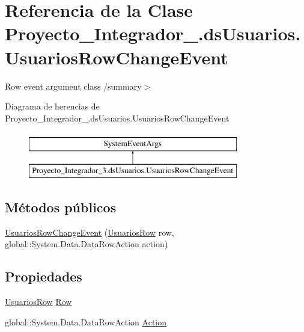 \hypertarget{class_proyecto___integrador__3_1_1ds_usuarios_1_1_usuarios_row_change_event}{\section{Referencia de la Clase Proyecto\-\_\-\-Integrador\-\_.\-ds\-Usuarios.\-Usuarios\-Row\-Change\-Event}
\label{class_proyecto___integrador__3_1_1ds_usuarios_1_1_usuarios_row_change_event}
}


Row event argument class /summary$>$  


Diagrama de herencias de Proyecto\-\_\-\-Integrador\-\_.\-ds\-Usuarios.\-Usuarios\-Row\-Change\-Event\begin{figure}[H]
\begin{center}
\leavevmode
\includegraphics[height=2.000000cm]{class_proyecto___integrador__3_1_1ds_usuarios_1_1_usuarios_row_change_event}
\end{center}
\end{figure}
\subsection*{Métodos públicos}
\begin{DoxyCompactItemize}
\item 
\hyperlink{class_proyecto___integrador__3_1_1ds_usuarios_1_1_usuarios_row_change_event_a2bb91a739acbdbba94b0c5d878fa93e4}{Usuarios\-Row\-Change\-Event} (\hyperlink{class_proyecto___integrador__3_1_1ds_usuarios_1_1_usuarios_row}{Usuarios\-Row} row, global\-::\-System.\-Data.\-Data\-Row\-Action action)
\end{DoxyCompactItemize}
\subsection*{Propiedades}
\begin{DoxyCompactItemize}
\item 
\hyperlink{class_proyecto___integrador__3_1_1ds_usuarios_1_1_usuarios_row}{Usuarios\-Row} \hyperlink{class_proyecto___integrador__3_1_1ds_usuarios_1_1_usuarios_row_change_event_a826214dc22ebf1a596d46c1e6f19848c}{Row}
\item 
global\-::\-System.\-Data.\-Data\-Row\-Action \hyperlink{class_proyecto___integrador__3_1_1ds_usuarios_1_1_usuarios_row_change_event_a999538fbd2ec0d0947e4cf96b2eb55a7}{Action}
\end{DoxyCompactItemize}
